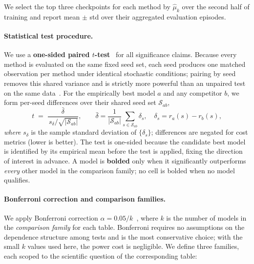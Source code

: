 We select the top three checkpoints for each method by $\hat{\mu}_k$ over the second half of training and report mean $\pm$ std over their aggregated evaluation episodes.

\paragraph{Statistical test procedure.}\label{sec:stat_testing}
We use a \textbf{one-sided paired $t$-test}~\citep{student1908probable} for all significance claims.
Because every method is evaluated on the same fixed seed set, each seed produces one matched observation per method under identical stochastic conditions; pairing by seed removes this shared variance and is strictly more powerful than an unpaired test on the same data~\cite{montgomery2017design}.
For the empirically best model $a$ and any competitor $b$, we form per-seed differences over their shared seed set $\mathcal{S}_{ab}$,
\begin{equation}
t \;=\; \frac{\bar{\delta}}{\,s_{\delta}/\sqrt{|\mathcal{S}_{ab}|}},
\qquad
\bar{\delta} = \frac{1}{|\mathcal{S}_{ab}|}\sum_{s \in \mathcal{S}_{ab}}\delta_s,
\quad
\delta_s = r_a(s) - r_b(s),
\label{eq:paired_t}
\end{equation}
\noindent\textit{where} $s_{\delta}$ is the sample standard deviation of $\{\delta_s\}$; differences are negated for cost metrics (lower is better).
The test is one-sided because the candidate best model is identified by its empirical mean before the test is applied, fixing the direction of interest in advance.
A model is \textbf{bolded} only when it significantly outperforms \emph{every} other model in the comparison family; no cell is bolded when no model qualifies.

\paragraph{Bonferroni correction and comparison families.}
We apply Bonferroni correction $\alpha = 0.05/k$~\cite{hochberg1987multiple}, where $k$ is the number of models in the \emph{comparison family} for each table.
Bonferroni requires no assumptions on the dependence structure among tests and is the most conservative choice; with the small $k$ values used here, the power cost is negligible.
We define three families, each scoped to the scientific question of the corresponding table:

